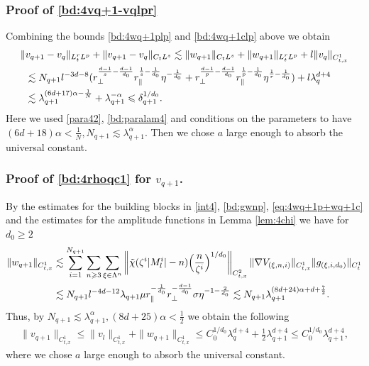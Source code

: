 \documentclass[UTF-8,reqno]{amsart}
\numberwithin{equation}{section}
\theoremstyle{definition}
\def\({{\Big(}}
\def\){{\Big)}}
\newcommand{\norm}[1]{\left\|#1\right\|}
\def\geq{\geqslant}
\def\leq{\leqslant}
\def\({{\Big(}}
\def\){{\Big)}}
\def\geq{\geqslant}
\def\leq{\leqslant}
\begin{document}
\subsubsection{Proof of  \eqref{bd:4vq+1-vqlpr}}

Combining  the bounds \eqref{bd:4wq+1plp} and \eqref{bd:4wq+1clp} above we obtain 
\begin{align}
\|&v_{q+1}-v_q\|_{L^{r}_tL^{p}}+\|v_{q+1}-v_q\|_{C_tL^{s}}\lesssim  \|w_{q+1}\|_{C_tL^{s}}+  \|w_{q+1}\|_{L^{r}_tL^{p}}+l\|v_q\|_{C_{t,x}^1}\notag \\
&\lesssim  N_{q+1}l^{-3d-8}( r_\perp^{\frac{d-1}s-\frac{d-1}{d_0}} r_\parallel^{\frac1s-\frac{1}{d_0}}\eta^{-\frac1{d_0}}+r_\perp^{\frac{d-1}{p}-\frac{d-1}{d_0}} r_\parallel^{\frac{1}{p}-\frac{1}{d_0}}\eta^{\frac1r-\frac1{d_0}})+l \lambda_q^{d+4}\notag\\ 
&\lesssim \lambda_{q+1}^{(6d+17)\alpha-\frac1N}+\lambda_{q+1}^{-\alpha}
\leq\delta_{q+1}^{1/d_0}.\label{bd:4wq+1lpr}
\end{align}
  Here we used \eqref{para42}, \eqref{bd:paralam4} and  conditions on the parameters to have 
${(6d+18)\alpha<\frac{1}{N}},N_{q+1}\lesssim\lambda_{q+1}^{\alpha}$. Then we chose $a$ large enough to absorb the universal constant. 


\subsubsection{Proof of  \eqref{bd:4rhoqc1} for $v_{q+1}$.}
 By the estimates for the building blocks in \eqref{int4}, \eqref{bd:gwnp},  \eqref{eq:4wq+1p+wq+1c} and the estimates for the amplitude functions in Lemma \ref{lem:4chi} we have for $d_0\geq2$
\begin{align}
\|w_{q+1}\|_{C_{t,x}^1}&\lesssim\sum_{i=1}^{N_{q+1}}\sum_{n\geq3}\sum_{\xi\in\Lambda^{n}}\norm{\tilde{\chi}(\zeta^{i}|M^{i}_l|-n)\(\frac{n}{\zeta^{i}}\)^{1/d_0}}_{C_{t,x}^{2}}\|\nabla V_{(\xi,n,i)}\|_{C_{t,x}^1}\|g_{(\xi,i,d_0)}\|_{C_t^1}\notag\\
&\lesssim N_{q+1}l^{-4d-12}\lambda_{q+1}\mu r_\parallel^{-\frac{1}{d_0}}r_\perp^{-\frac{d-1}{d_0}}\sigma\eta^{-1-\frac{2}{d_0}}\lesssim N_{q+1}\lambda_{q+1}^{(8d+24)\alpha+d+\frac72}.\notag
\end{align}
 Thus, by $N_{q+1}\lesssim\lambda_{q+1}^{\alpha},(8d+25)\alpha<\frac{1}{2}$ we obtain the following
 \begin{align*}
\|v_{q+1}\|_{C_{t,x}^1}\leq\|v_{l}\|_{C_{t,x}^1}+\|w_{q+1}\|_{C_{t,x}^1}\leq C_0^{1/d_0}\lambda_{q}^{d+4}+\frac12\lambda_{q+1}^{d+4}\leq C_0^{1/d_0}\lambda_{q+1}^{d+4},
 \end{align*} where we chose $a$ large enough to absorb the universal constant.
\end{document}
